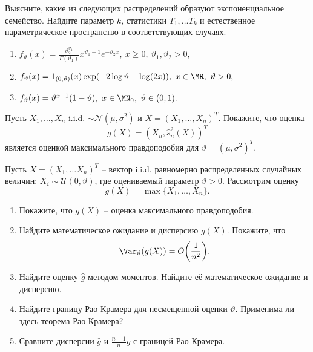 \begin{exc}
	Выясните, какие из следующих распределений образуют экспоненциальное семейство. Найдите параметр $k$, статистики $T_1, \dots T_k$ и естественное параметрическое пространство в соответствующих случаях.
	\begin{enumerate}
	    \item $ f_\vartheta(x) = \frac{\vartheta_2^{\vartheta_1}}{\Gamma(\vartheta_1)}x^{\vartheta_1-1}e^{-\vartheta_2x}, \ x \geq 0,\ \vartheta_1, \vartheta_2 > 0, $
	    \item $ f_\vartheta(x) = 1_{(0, \vartheta)}(x) \exp(-2 \log \vartheta + \log(2x)), \ x \in \MR,\ \vartheta > 0,  $
	    \item $ f_\vartheta(x) = \vartheta^{x-1}(1-\vartheta), \ x \in \MN_0,\ \vartheta \in (0, 1).$ 
	\end{enumerate}
\end{exc}

\begin{exc}
	Пусть $X_1, \dots, X_n$ i.i.d. $\sim \mathcal{N}(\mu, \sigma^2)$ и $X = (X_1, \dots, X_n)^T$. Покажите, что оценка
	\[ g(X) = (\overline{X}_n, \hat{s}_n^2(X))^T  \]
	является оценкой максимального правдоподобия для $\vartheta = (\mu, \sigma^2)^T$.
\end{exc}

\begin{exc}
	Пусть $X = (X_1, \dots X_n)^T$ -- вектор i.i.d. равномерно распределенных случайных величин: $X_i \sim \mathcal{U}(0, \vartheta)$, где оцениваемый параметр $\vartheta > 0$. Рассмотрим оценку
	\[ g(X) = \max\{ X_1, \dots, X_n \}. \]
	\begin{enumerate}
		\item Покажите, что $g(X)$ -- оценка максимального правдоподобия.
		\item Найдите математическое ожидание и дисперсию $g(X)$. Покажите, что
		\[ \Var_\vartheta(g(X))=O \bigg(\frac{1}{n^2} \bigg). \]
		\item Найдите оценку $\hat{g}$ методом моментов. Найдите её математическое ожидание и дисперсию.
		\item Найдите границу Рао-Крамера для несмещенной оценки $\vartheta$. Применима ли здесь теорема Рао-Крамера?
		\item Сравните дисперсии $\hat{g}$ и $\frac{n+1}{n}g$ с границей Рао-Крамера.
	\end{enumerate}
\end{exc}
